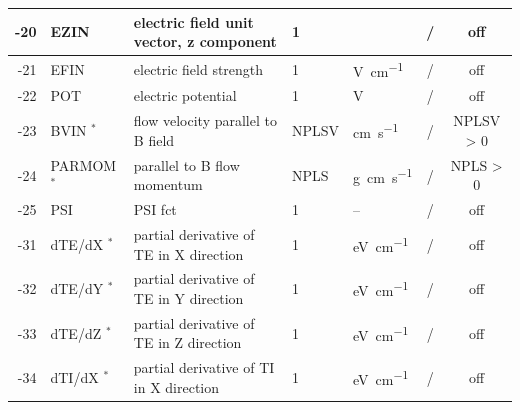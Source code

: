 \begin{landscape}
\begin{longtable}{|r|l|l|l|l|c|c|}
    -20                    & EZIN                         & electric field unit vector,
    z component            & 1                            &                                   & /              & off
    \\ \hline
    -21                    & EFIN                         & electric field strength
			   & 1                            & \si{\volt\per\centi\metre}        & /              & off
    \\ \hline
    -22                    & POT                          & electric potential
			   & 1                            & \si{\volt}                        & /              & off
    \\ \hline
    -23                    & BVIN $^*$                    & flow velocity parallel to B
    field                  & NPLSV                        & \si{\centi\metre\per\second}      & /              & NPLSV > 0
    \\ \hline
    -24                    & PARMOM $^*$                  & parallel to B flow momentum
			   & NPLS                         & \si{\gram\centi\metre\per\second} & /              & NPLS > 0
    \\ \hline
    -25                    & PSI
                           & PSI fct                      & 1                                 & --
			   & /              & off      
    \\ \hline
    -31                    & dTE/dX $^*$
                           & partial derivative of TE in X direction  
                           & 1                            & \si{\electronvolt\per\centi\meter}
			   & /              & off         
    \\ \hline
    -32                    & dTE/dY $^*$
                           & partial derivative of TE in Y direction  
                           & 1                            & \si{\electronvolt\per\centi\meter}
			   & /              & off        
    \\ \hline
    -33                    & dTE/dZ $^*$
                           & partial derivative of TE in Z direction  
                           & 1                            & \si{\electronvolt\per\centi\meter}
			   & /              & off
    \\ \hline
    -34                    & dTI/dX $^*$
                           & partial derivative of TI in X direction  
                           & 1                            & \si{\electronvolt\per\centi\meter}
			   & /              & off         
    \\ \hline

\end{longtable}
\end{landscape}
